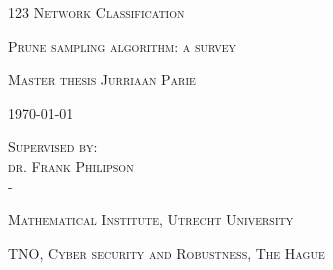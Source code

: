 \documentclass[a4paper, twoside, 11pt]{report}
\theoremstyle{plain}
\theoremstyle{definition}
\theoremstyle{remark}
\begin{document}






\begin{titlepage}
	\centering
	\vspace{1cm}

	{
		\huge
		\textsc{123 Network Classification}
	}
	
	\vspace{0.25cm}
	
	{
		\large
		\textsc{Prune sampling algorithm: a survey}
	}

	\vspace{1.5cm}

	{
		\Large
		\textsc{Master thesis Jurriaan Parie}
	}

	\vspace{1cm}

	{
		\large
		\textsc{\today}
	}
	
		\vspace{2cm}
	
	{
		\large
		\textsc{Supervised by: \\
		dr. Frank Philipson\\
		-}
	}
	
	\vspace{3cm}
	
	{
		\large
		\textsc{Mathematical Institute, Utrecht University}
	}
		
	\vspace{0.5cm}
		
	{
		\large
		\textsc{TNO, Cyber security and Robustness, The Hague}
	}
	
	\vspace{2cm}
%	
	
\end{titlepage}


\pagestyle{plain}





\end{document}
